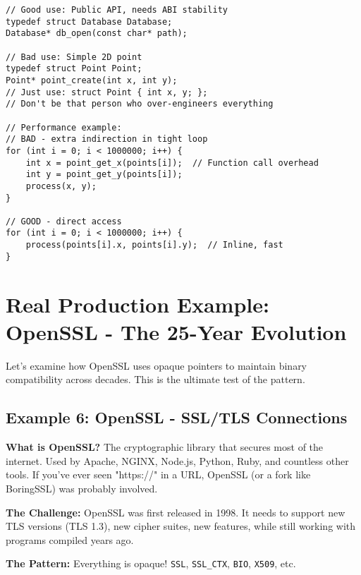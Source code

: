 \begin{lstlisting}
// Good use: Public API, needs ABI stability
typedef struct Database Database;
Database* db_open(const char* path);

// Bad use: Simple 2D point
typedef struct Point Point;
Point* point_create(int x, int y);
// Just use: struct Point { int x, y; };
// Don't be that person who over-engineers everything

// Performance example:
// BAD - extra indirection in tight loop
for (int i = 0; i < 1000000; i++) {
    int x = point_get_x(points[i]);  // Function call overhead
    int y = point_get_y(points[i]);
    process(x, y);
}

// GOOD - direct access
for (int i = 0; i < 1000000; i++) {
    process(points[i].x, points[i].y);  // Inline, fast
}
\end{lstlisting}

\section{Real Production Example: OpenSSL - The 25-Year Evolution}

Let's examine how OpenSSL uses opaque pointers to maintain binary compatibility across decades. This is the ultimate test of the pattern.

\subsection{Example 6: OpenSSL - SSL/TLS Connections}

\textbf{What is OpenSSL?} The cryptographic library that secures most of the internet. Used by Apache, NGINX, Node.js, Python, Ruby, and countless other tools. If you've ever seen "https://" in a URL, OpenSSL (or a fork like BoringSSL) was probably involved.

\textbf{The Challenge:} OpenSSL was first released in 1998. It needs to support new TLS versions (TLS 1.3), new cipher suites, new features, while still working with programs compiled years ago.

\textbf{The Pattern:} Everything is opaque! \texttt{SSL}, \texttt{SSL\_CTX}, \texttt{BIO}, \texttt{X509}, etc.

